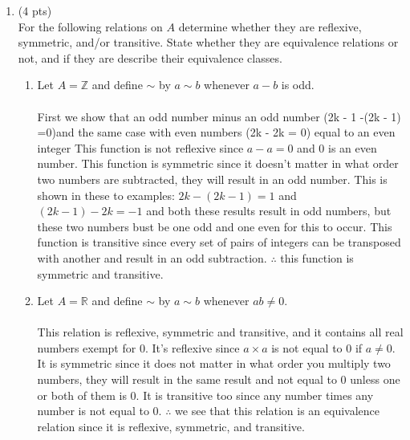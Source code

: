 \documentclass[12pt]{article}
\begin{document}
\begin{enumerate}
\item (4 pts) \\
For the following relations on $A$ determine whether they are reflexive, symmetric, and/or transitive. State whether they are equivalence relations or not, and if they are describe their equivalence classes.
\begin{enumerate}
	\item Let $A=\mathbb{Z}$ and define $\sim$ by $a\sim b$ whenever  $a- b$ is odd.\\
    \\First we show that an odd number minus an odd number (2k - 1 -(2k - 1) =0)and the same case with even numbers (2k - 2k = 0) equal to an even integer This function is not reflexive since $a-a =0$ and 0 is an even number. This function is symmetric since it doesn't matter in what order two numbers are subtracted, they will result in an odd number. This is shown in these to examples: $2k - (2k - 1) = 1$ and $(2k - 1) - 2k = -1$ and both these results result in odd numbers, but these two numbers bust be one odd and one even for this to occur. This function is transitive since every set of pairs of integers can be transposed with another and result in an odd subtraction. $\therefore$ this function is symmetric and transitive.
	\item Let $A=\mathbb{R}$ and define $\sim$ by $a\sim b$ whenever $ab \neq 0$.\\
    \\This relation is reflexive, symmetric and transitive, and it contains all real numbers exempt for 0. It's reflexive since $a\times a$ is not equal to 0 if $a \neq 0$. It is symmetric since it does not matter in what order you multiply two numbers, they will result in the same result and not equal to 0 unless one or both of them is 0. It is transitive too since any number times any number is not equal to 0. $\therefore$ we see that this relation is an equivalence relation since it is reflexive, symmetric, and transitive.
\end{enumerate}	
	



\vfill
\end{enumerate}
\end{document}
